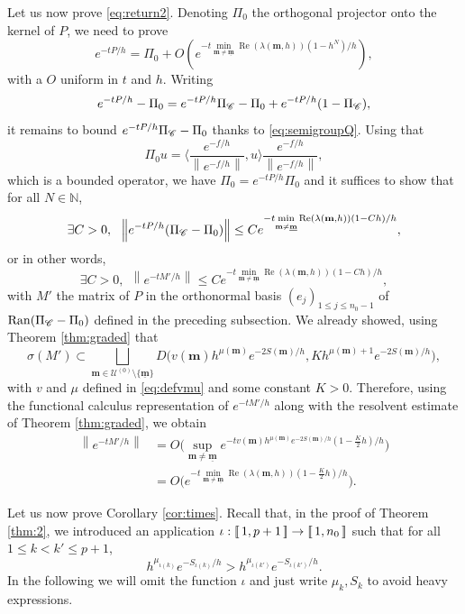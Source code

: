 \documentclass[12pt]{amsart}
\renewcommand{\Re}{\operatorname{Re}}
\newcommand{\N}{\mathbb N}
\newcommand{\Ran}{\operatorname{Ran}}
\def\<{\langle}
\def\>{\rangle}
\numberwithin{equation}{section}
\numberwithin{figure}{section}
\def\m{\mathbf{m}}
\def\um{\underline{\m}}
\newcommand{\vvert}[1]{\left\lVert#1\right\rVert}
\newcommand{\lb}{\operatorname{[\negthinspace [}}
\newcommand{\rb}{\operatorname{]\negthinspace ]}}
\def\uuu{{\mathcal U}}\def\vvv{{\mathcal V}}\def\www{{\mathcal W}}\def\xxx{{\mathcal X}}
\begin{document}
Let us now prove \eqref{eq:return2}. Denoting $\Pi_0$ the orthogonal projector onto the kernel of $P$, we need to prove
\begin{equation*}
e^{-tP/h} = \Pi_0 + O(e^{-t\underset{\m\neq\um}{\min}\Re(\lambda(\m,h))(1-h^N)/h}),
\end{equation*}
with a $O$ uniform in $t$ and $h$. Writing
\begin{equation*}
e^{-tP/h} - \Pi_0 = e^{-tP/h}\Pi_{\mathscr C} - \Pi_0 + e^{-tP/h}(1-\Pi_{\mathscr C}),
\end{equation*}
it remains to bound $e^{-tP/h}\Pi_{\mathscr C} - \Pi_0$ thanks to \eqref{eq:semigroupQ}. Using that
\begin{equation*}
\Pi_0u = \<\frac{e^{-f/h}}{\vvert{e^{-f/h}}},u\>\frac{e^{-f/h}}{\vvert{e^{-f/h}}},
\end{equation*}
which is a bounded operator, we have $\Pi_0 = e^{-tP/h}\Pi_0$ and it suffices to show that for all $N\in\N$,
\begin{equation*}
\exists C>0,\ \ \vvert{e^{-tP/h}(\Pi_\Cr-\Pi_0)} \leq Ce^{-t\underset{\m\neq\um}{\min}\Re(\lambda(\m,h))(1-Ch)/h},
\end{equation*}
or in other words,
\begin{equation*}
\exists C>0,\ \ \vvert{e^{-tM'/h}} \leq Ce^{-t\underset{\m\neq\um}{\min}\Re(\lambda(\m,h))(1-Ch)/h},
\end{equation*}
with $M'$ the matrix of $P$ in the orthonormal basis $(e_j)_{1\leq j\leq n_0-1}$ of $\Ran(\Pi_\Cr-\Pi_0)$ defined in the preceding subsection. We already showed, using Theorem \ref{thm:graded} that
\begin{equation*}
\sigma(M') \subset \bigsqcup_{\m\in\uuu^{(0)}\setminus\{\um\}} D\big(v(\m)h^{\mu(\m)}e^{-2S(\m)/h},Kh^{\mu(\m)+1}e^{-2S(\m)/h}\big),
\end{equation*}
with $v$ and $\mu$ defined in \eqref{eq:defvmu} and some constant $K>0$. Therefore, using the functional calculus representation of $e^{-tM'/h}$ along with the resolvent estimate of Theorem \ref{thm:graded}, we obtain
\begin{equation*}
\begin{split}
    \vvert{e^{-tM'/h}} &= O\Big(\sup_{\m\neq\um}e^{-tv(\m)h^{\mu(\m)}e^{-2S(\m)/h}(1-\frac K2h)/h}\Big)\\
    &= O\Big(e^{-t\underset{\m\neq\um}{\min}\Re(\lambda(\m,h))(1-\frac K2h)/h}\Big).
\end{split}
\end{equation*}

Let us now prove Corollary \ref{cor:times}. Recall that, in the proof of Theorem \ref{thm:2}, we introduced an application $\iota:\lb1,p+1\rb\to\lb1,n_0\rb$ such that for all $1\leq k<k'\leq p+1$,
\begin{equation*}
h^{\mu_{\iota(k)}}e^{-S_{\iota(k)}/h} > h^{\mu_{\iota(k')}}e^{-S_{\iota(k')}/h}.
\end{equation*}
In the following we will omit the function $\iota$ and just write $\mu_k,S_k$ to avoid heavy expressions.
\end{document}
